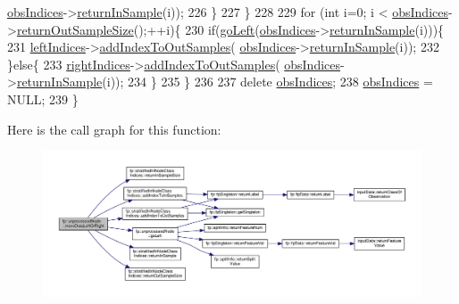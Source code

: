 \begin{DoxyCode}
      \hyperlink{classfp_1_1unprocessedNode_aea171244695a3a099061188a9553e525}{obsIndices}->\hyperlink{classfp_1_1stratifiedInNodeClassIndices_a2d7e802fb97db0367bb8e8f31d393afd}{returnInSample}(i)); 
226                         \}
227                     \}
228 
229                     \textcolor{keywordflow}{for} (\textcolor{keywordtype}{int} i=0; i < \hyperlink{classfp_1_1unprocessedNode_aea171244695a3a099061188a9553e525}{obsIndices}->\hyperlink{classfp_1_1stratifiedInNodeClassIndices_a6630b77af340d2023d88bafa87b94cae}{returnOutSampleSize}();++i)\{
230                         \textcolor{keywordflow}{if}(\hyperlink{classfp_1_1unprocessedNode_ad4ffdb4f4b91d6d21f8954f3c80a3617}{goLeft}(\hyperlink{classfp_1_1unprocessedNode_aea171244695a3a099061188a9553e525}{obsIndices}->\hyperlink{classfp_1_1stratifiedInNodeClassIndices_a2d7e802fb97db0367bb8e8f31d393afd}{returnInSample}(i)))\{
231                             \hyperlink{classfp_1_1unprocessedNode_a0a147fea04670ff34ef0891a14ec67a3}{leftIndices}->\hyperlink{classfp_1_1stratifiedInNodeClassIndices_adc99a046031545bc59c2b43abcf75ed9}{addIndexToOutSamples}(
      \hyperlink{classfp_1_1unprocessedNode_aea171244695a3a099061188a9553e525}{obsIndices}->\hyperlink{classfp_1_1stratifiedInNodeClassIndices_a2d7e802fb97db0367bb8e8f31d393afd}{returnInSample}(i)); 
232                         \}\textcolor{keywordflow}{else}\{
233                             \hyperlink{classfp_1_1unprocessedNode_a4e805660b305b1056cea187ed5584a1d}{rightIndices}->\hyperlink{classfp_1_1stratifiedInNodeClassIndices_adc99a046031545bc59c2b43abcf75ed9}{addIndexToOutSamples}(
      \hyperlink{classfp_1_1unprocessedNode_aea171244695a3a099061188a9553e525}{obsIndices}->\hyperlink{classfp_1_1stratifiedInNodeClassIndices_a2d7e802fb97db0367bb8e8f31d393afd}{returnInSample}(i)); 
234                         \}
235                     \}
236 
237                     \textcolor{keyword}{delete} \hyperlink{classfp_1_1unprocessedNode_aea171244695a3a099061188a9553e525}{obsIndices};
238                     \hyperlink{classfp_1_1unprocessedNode_aea171244695a3a099061188a9553e525}{obsIndices} = NULL;
239                 \}
\end{DoxyCode}
Here is the call graph for this function\+:\nopagebreak
\begin{figure}[H]
\begin{center}
\leavevmode
\includegraphics[width=350pt]{classfp_1_1unprocessedNode_a0236d2722cb4c32b8ff7e66fc118bed2_cgraph}
\end{center}
\end{figure}
